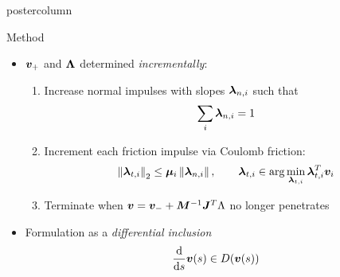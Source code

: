\documentclass[final,hyperref={pdfpagelabels=false},5pt]{beamer}
\begin{document}
\begin{frame}
\begin{columns}
\begin{column}{.49\textwidth}
\begin{beamercolorbox}[center,wd=\textwidth]{postercolumn}
\begin{minipage}[T]{.95\textwidth}
{\begin{block}{Method}
\begin{itemize}
	              \item $\bm{v}_+$ and $\Impulse$ determined \textit{incrementally}:
	              
	              \begin{enumerate}
	              	\item Increase normal impulses with slopes $\NormalForce[i]$ such that
	              		$$\sum_i \NormalForce[i] = 1$$
	              	\item Increment each friction impulse via Coulomb friction:
	             		$$\TwoNorm{\FrictionForce[i]} \leq \FrictionCoeff[i]\Norm{\NormalForce[i]},\qquad \FrictionForce[i] \in \arg \min_{\FrictionForce[i]} \FrictionForce[i]^T\Velocity_i$$
	              	\item Terminate when $\Velocity = \Velocity_- + \Mass^{-1}\J^T \Lambda$ no longer penetrates
	              \end{enumerate}
	              \item
	              Formulation as a \textit{differential inclusion}
	              $$\frac{\mathrm{d}}{\mathrm{d}s} \bm{v}(s) \in D(\bm{v}(s))$$
              \end{itemize}
            \end{block}
            \footnotesize{\color{pennbl}
				
				}
           \begin{columns}[c]
				\begin{column}{.25\textwidth}
				
				\begin{figure}
				

\end{figure}
\end{column}
\end{columns}}
\end{minipage}
\end{beamercolorbox}
\end{column}
\end{columns}
\end{frame}
\end{document}
